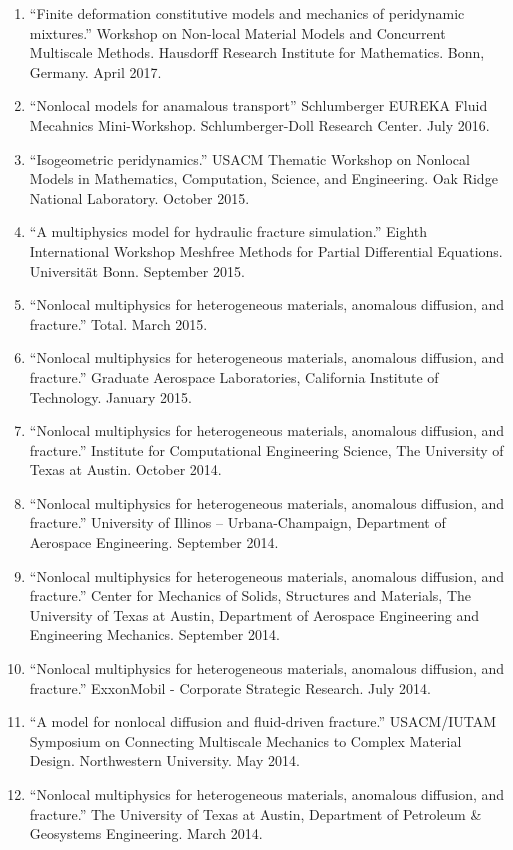 \begin{etaremune}
\begin{enumerate}
    \item ``Finite deformation constitutive models and mechanics of peridynamic mixtures.'' Workshop on Non-local Material Models and Concurrent Multiscale Methods. Hausdorff Research Institute for Mathematics.  Bonn, Germany.  April 2017.
    \item ``Nonlocal models for anamalous transport'' Schlumberger EUREKA Fluid Mecahnics Mini-Workshop. Schlumberger-Doll Research Center. July 2016.
    \item ``Isogeometric peridynamics.'' USACM Thematic Workshop on Nonlocal Models in Mathematics, Computation, Science, and Engineering.  Oak Ridge National Laboratory. October 2015.
    \item ``A multiphysics model for hydraulic fracture simulation.''  Eighth International Workshop Meshfree Methods for Partial Differential Equations. Universit\"{a}t Bonn. September 2015.
    \item ``Nonlocal multiphysics for heterogeneous materials, anomalous diffusion, and fracture.'' Total. March 2015.
    \item ``Nonlocal multiphysics for heterogeneous materials, anomalous diffusion, and fracture.'' Graduate Aerospace Laboratories, California Institute of Technology. January 2015.
    \item ``Nonlocal multiphysics for heterogeneous materials, anomalous diffusion, and fracture.'' Institute for Computational Engineering Science, The University of Texas at Austin. October 2014.
    \item ``Nonlocal multiphysics for heterogeneous materials, anomalous diffusion, and fracture.'' University of Illinos -- Urbana-Champaign, Department of Aerospace Engineering. September 2014.
    \item ``Nonlocal multiphysics for heterogeneous materials, anomalous diffusion, and fracture.'' Center for Mechanics of Solids, Structures and Materials, The University of Texas at Austin, Department of Aerospace Engineering and Engineering Mechanics. September 2014.
    \item ``Nonlocal multiphysics for heterogeneous materials, anomalous diffusion, and fracture.'' ExxonMobil - Corporate Strategic Research. July 2014.
    \item ``A model for nonlocal diffusion and fluid-driven fracture.'' USACM/IUTAM Symposium on Connecting Multiscale Mechanics to Complex Material Design. Northwestern University. May 2014.
    \item ``Nonlocal multiphysics for heterogeneous materials, anomalous diffusion, and fracture.'' The University of Texas at Austin, Department of Petroleum \& Geosystems Engineering. March 2014.

\end{enumerate}
\end{etaremune}
